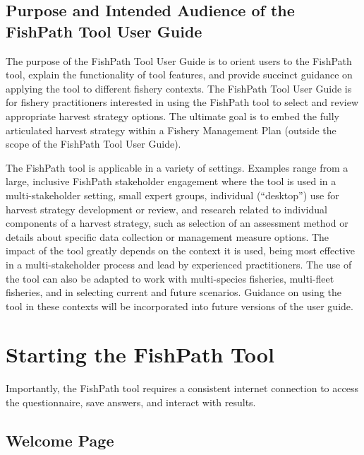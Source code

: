 \documentclass[11pt,]{book}
\begin{document}
\hypertarget{purpose-and-intended-audience-of-the-fishpath-tool-user-guide}{%
\section{Purpose and Intended Audience of the FishPath Tool User Guide}\label{purpose-and-intended-audience-of-the-fishpath-tool-user-guide}}

The purpose of the FishPath Tool User Guide is to orient users to the FishPath tool, explain the functionality of tool features, and provide succinct guidance on applying the tool to different fishery contexts. The FishPath Tool User Guide is for fishery practitioners interested in using the FishPath tool to select and review appropriate harvest strategy options. The ultimate goal is to embed the fully articulated harvest strategy within a Fishery Management Plan (outside the scope of the FishPath Tool User Guide).

The FishPath tool is applicable in a variety of settings. Examples range from a large, inclusive FishPath stakeholder engagement where the tool is used in a multi-stakeholder setting, small expert groups, individual (``desktop'') use for harvest strategy development or review, and research related to individual components of a harvest strategy, such as selection of an assessment method or details about specific data collection or management measure options. The impact of the tool greatly depends on the context it is used, being most effective in a multi-stakeholder process and lead by experienced practitioners. The use of the tool can also be adapted to work with multi-species fisheries, multi-fleet fisheries, and in selecting current and future scenarios. Guidance on using the tool in these contexts will be incorporated into future versions of the user guide.

\hypertarget{starting-the-fishpath-tool}{%
\chapter{Starting the FishPath Tool}\label{starting-the-fishpath-tool}}

Importantly, the FishPath tool requires a consistent internet connection to access the questionnaire, save answers, and interact with results.

\hypertarget{welcome-page}{%
\section{Welcome Page}\label{welcome-page}}
\end{document}
